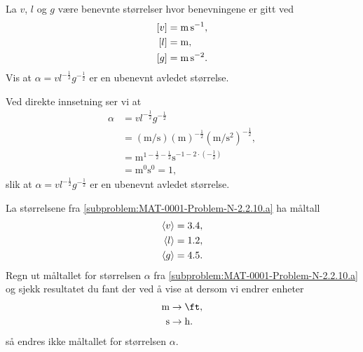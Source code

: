 \documentclass[a4paper,11pt]{article}
\begin{document}
\begin{problem}[10]
    \begin{subproblem}
      \label{subproblem:MAT-0001-Problem-N-2.2.10.a}
      La $v$, $l$ og $g$ være benevnte størrelser hvor benevningene er
        gitt ved
        \begin{align*}
          \bpar{v} &= \si{\m\per\s},\\
          \bpar{l} &= \si{\m},\\
          \bpar{g} &= \si{\m\per\s\squared}.
        \end{align*}
        Vis at $\alpha = v l^{-\frac{1}{2}} g^{-\frac{1}{2}}$ er en ubenevnt avledet størrelse.
    \end{subproblem}
\end{problem}
\begin{solution}
    Ved direkte innsetning ser vi at 
    \begin{align*}
            \alpha
        &=  v l^{-\frac{1}{2}} g^{-\frac{1}{2}} \\
        &= (\si{\m\per\s})(\si{\m})^{-\frac{1}{2}}(\si{\m\per\s\squared})^{-\frac{1}{2}}, \\
        &= \si{\m\tothe{1 -\frac{1}{2} - \frac{1}{2}}\s\tothe{-1-2\cdot(-\frac{1}{2})}} \\
        &= \si{\m\tothe{0}\s\tothe{0}} = 1,
    \end{align*}
    slik at $\alpha = v l^{-\frac{1}{2}} g^{-\frac{1}{2}}$ er en ubenevnt avledet størrelse.
\end{solution}
    \begin{subproblem}
      La størrelsene fra \cref{subproblem:MAT-0001-Problem-N-2.2.10.a} ha måltall
        \begin{align*}
          \langle v\rangle &= \num{3.4},\\
          \langle l\rangle &= \num{1.2},\\
          \langle g\rangle &= \num{4.5}.
        \end{align*}
        Regn ut måltallet for størrelsen $\alpha$ fra \cref{subproblem:MAT-0001-Problem-N-2.2.10.a} og sjekk resultatet
        du fant der ved å vise at dersom vi endrer enheter
        \begin{align*}
          \si{\m} &\rightarrow \si{\ft},\\
          \si{\s} &\rightarrow \si{\hour}.
        \end{align*}
        så endres ikke måltallet for størrelsen $\alpha$.
    \end{subproblem}
\end{document}
